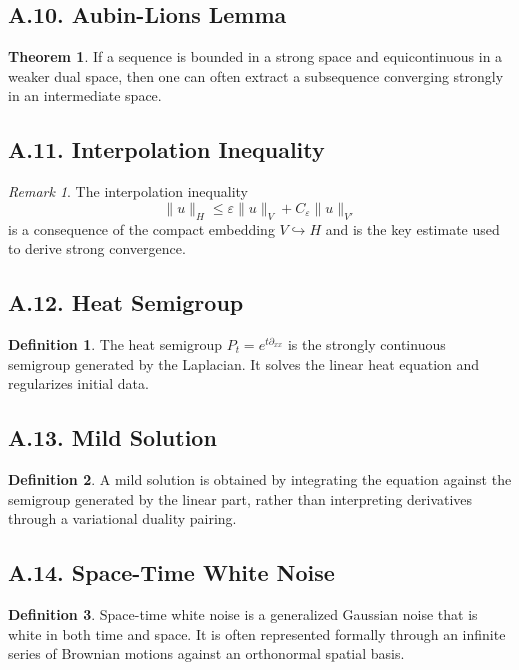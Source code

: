 \documentclass[11pt]{article}
\theoremstyle{definition}
\newtheorem{definition}{Definition}
\newtheorem{theorem}{Theorem}
\theoremstyle{remark}
\newtheorem{remark}{Remark}
\begin{document}
\subsection*{A.10. Aubin-Lions Lemma}
\begin{theorem}
If a sequence is bounded in a strong space and equicontinuous in a weaker dual space, then one can often extract a subsequence converging strongly in an intermediate space.
\end{theorem}

\subsection*{A.11. Interpolation Inequality}
\begin{remark}
The interpolation inequality
\[
\|u\|_H\le \varepsilon\|u\|_V+C_\varepsilon\|u\|_{V'}
\]
is a consequence of the compact embedding \(V\hookrightarrow H\) and is the key estimate used to derive strong convergence.
\end{remark}

\subsection*{A.12. Heat Semigroup}
\begin{definition}
The heat semigroup \(P_t=e^{t\partial_{xx}}\) is the strongly continuous semigroup generated by the Laplacian. It solves the linear heat equation and regularizes initial data.
\end{definition}

\subsection*{A.13. Mild Solution}
\begin{definition}
A mild solution is obtained by integrating the equation against the semigroup generated by the linear part, rather than interpreting derivatives through a variational duality pairing.
\end{definition}

\subsection*{A.14. Space-Time White Noise}
\begin{definition}
Space-time white noise is a generalized Gaussian noise that is white in both time and space. It is often represented formally through an infinite series of Brownian motions against an orthonormal spatial basis.
\end{definition}
\end{document}
